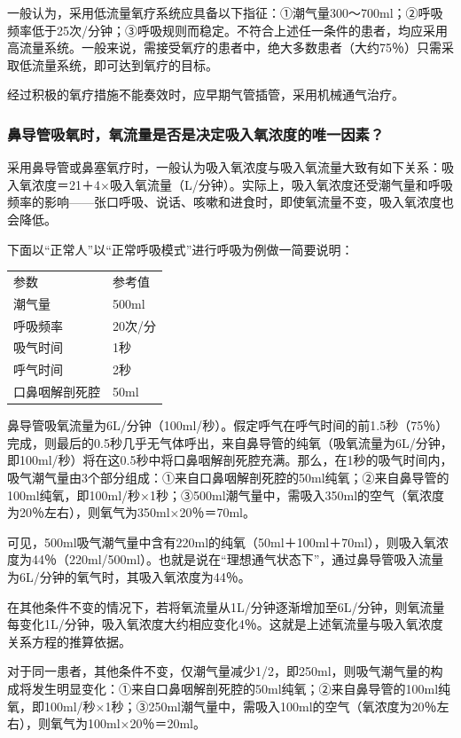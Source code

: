 一般认为，采用低流量氧疗系统应具备以下指征：①潮气量300～700ml；②呼吸频率低于25次/分钟；③呼吸规则而稳定。不符合上述任一条件的患者，均应采用高流量系统。一般来说，需接受氧疗的患者中，绝大多数患者（大约75％）只需采取低流量系统，即可达到氧疗的目标。

经过积极的氧疗措施不能奏效时，应早期气管插管，采用机械通气治疗。

\subsubsection{鼻导管吸氧时，氧流量是否是决定吸入氧浓度的唯一因素？}

采用鼻导管或鼻塞氧疗时，一般认为吸入氧浓度与吸入氧流量大致有如下关系：吸入氧浓度＝21＋4×吸入氧流量（L/分钟）。实际上，吸入氧浓度还受潮气量和呼吸频率的影响------张口呼吸、说话、咳嗽和进食时，即使氧流量不变，吸入氧浓度也会降低。

下面以“正常人”以“正常呼吸模式”进行呼吸为例做一简要说明：

\begin{center}
\begin{tabular}{ll}
  参数&参考值\\
  潮气量&500ml\\
  呼吸频率&20次/分\\
  吸气时间&1秒\\
  呼气时间&2秒\\
  口鼻咽解剖死腔&50ml
\end{tabular}
\end{center}



鼻导管吸氧流量为6L/分钟（100ml/秒）。假定呼气在呼气时间的前1.5秒（75％）完成，则最后的0.5秒几乎无气体呼出，来自鼻导管的纯氧（吸氧流量为6L/分钟，即100ml/秒）将在这0.5秒中将口鼻咽解剖死腔充满。那么，在1秒的吸气时间内，吸气潮气量由3个部分组成：①来自口鼻咽解剖死腔的50ml纯氧；②来自鼻导管的100ml纯氧，即100ml/秒×1秒；③500ml潮气量中，需吸入350ml的空气（氧浓度为20％左右），则氧气为350ml×20％＝70ml。

可见，500ml吸气潮气量中含有220ml的纯氧（50ml＋100ml＋70ml），则吸入氧浓度为44％（220ml/500ml）。也就是说在“理想通气状态下”，通过鼻导管吸入流量为6L/分钟的氧气时，其吸入氧浓度为44％。

在其他条件不变的情况下，若将氧流量从1L/分钟逐渐增加至6L/分钟，则氧流量每变化1L/分钟，吸入氧浓度大约相应变化4％。这就是上述氧流量与吸入氧浓度关系方程的推算依据。

对于同一患者，其他条件不变，仅潮气量减少1/2，即250ml，则吸气潮气量的构成将发生明显变化：①来自口鼻咽解剖死腔的50ml纯氧；②来自鼻导管的100ml纯氧，即100ml/秒×1秒；③250ml潮气量中，需吸入100ml的空气（氧浓度为20％左右），则氧气为100ml×20％＝20ml。

